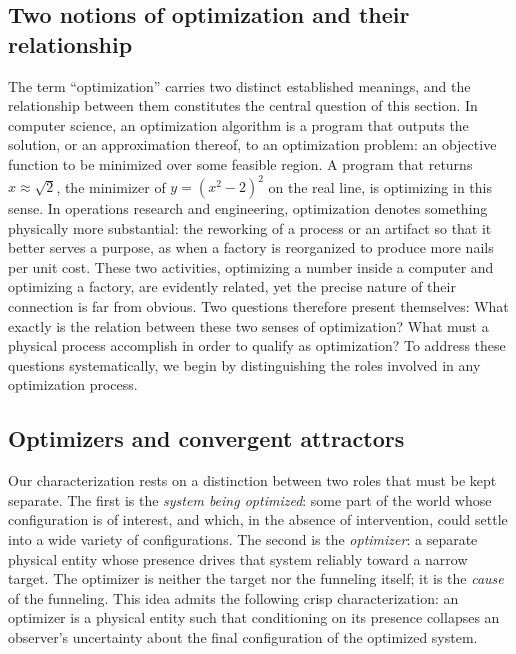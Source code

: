 \documentclass[11pt]{article}
\begin{document}
\subsection{Two notions of optimization and their relationship}

The term ``optimization'' carries two distinct established meanings, and the relationship between them constitutes the central question of this section. In computer science, an optimization algorithm is a program that outputs the solution, or an approximation thereof, to an optimization problem: an objective function to be minimized over some feasible region. A program that returns $x \approx \sqrt 2$, the minimizer of $y = (x^2 - 2)^2$ on the real line, is optimizing in this sense. In operations research and engineering, optimization denotes something physically more substantial: the reworking of a process or an artifact so that it better serves a purpose, as when a factory is reorganized to produce more nails per unit cost. These two activities, optimizing a number inside a computer and optimizing a factory, are evidently related, yet the precise nature of their connection is far from obvious. Two questions therefore present themselves: What exactly is the relation between these two senses of optimization? What must a physical process accomplish in order to qualify as optimization? To address these questions systematically, we begin by distinguishing the roles involved in any optimization process.

\subsection{Optimizers and convergent attractors}
\label{sec:attractor}

Our characterization rests on a distinction between two roles that must be kept separate. The first is the \emph{system being optimized}: some part of the world whose configuration is of interest, and which, in the absence of intervention, could settle into a wide variety of configurations. The second is the \emph{optimizer}: a separate physical entity whose presence drives that system reliably toward a narrow target. The optimizer is neither the target nor the funneling itself; it is the \emph{cause} of the funneling. This idea admits the following crisp characterization: an optimizer is a physical entity such that conditioning on its presence collapses an observer's uncertainty about the final configuration of the optimized system.
\end{document}
